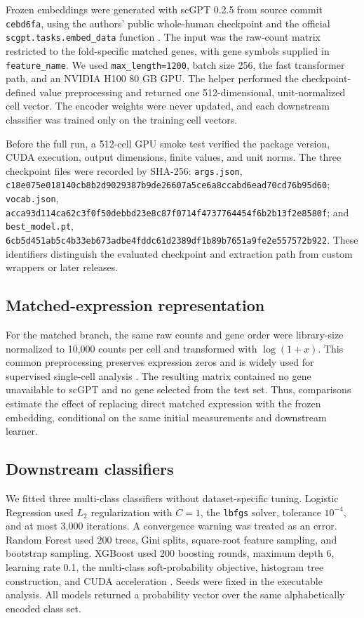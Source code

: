 Frozen embeddings were generated with scGPT 0.2.5 from source commit \texttt{cebd6fa}, using the authors' public whole-human checkpoint and the official \texttt{scgpt.tasks.embed\_data} function \citep{Cui2024}. The input was the raw-count matrix restricted to the fold-specific matched genes, with gene symbols supplied in \texttt{feature\_name}. We used \texttt{max\_length=1200}, batch size 256, the fast transformer path, and an NVIDIA H100 80 GB GPU. The helper performed the checkpoint-defined value preprocessing and returned one 512-dimensional, unit-normalized cell vector. The encoder weights were never updated, and each downstream classifier was trained only on the training cell vectors.

Before the full run, a 512-cell GPU smoke test verified the package version, CUDA execution, output dimensions, finite values, and unit norms. The three checkpoint files were recorded by SHA-256: \texttt{args.json}, \texttt{c18e075e018140cb8b2d9029387b9de26607a5ce6a8ccabd6ead70cd76b95d60}; \texttt{vocab.json}, \texttt{acca93d114ca62c3f0f50debbd23e8c87f0714f4737764454f6b2b13f2e8580f}; and \texttt{best\_model.pt}, \texttt{6cb5d451ab5c4b33eb673adbe4fddc61d2389df1b89b7651a9fe2e557572b922}. These identifiers distinguish the evaluated checkpoint and extraction path from custom wrappers or later releases.

\subsection{Matched-expression representation}

For the matched branch, the same raw counts and gene order were library-size normalized to 10,000 counts per cell and transformed with $\log(1+x)$. This common preprocessing preserves expression zeros and is widely used for supervised single-cell analysis \citep{Wolf2018,Hao2021}. The resulting matrix contained no gene unavailable to scGPT and no gene selected from the test set. Thus, comparisons estimate the effect of replacing direct matched expression with the frozen embedding, conditional on the same initial measurements and downstream learner.

\subsection{Downstream classifiers}

We fitted three multi-class classifiers without dataset-specific tuning. Logistic Regression used $L_2$ regularization with $C=1$, the \texttt{lbfgs} solver, tolerance $10^{-4}$, and at most 3,000 iterations. A convergence warning was treated as an error. Random Forest used 200 trees, Gini splits, square-root feature sampling, and bootstrap sampling. XGBoost used 200 boosting rounds, maximum depth 6, learning rate 0.1, the multi-class soft-probability objective, histogram tree construction, and CUDA acceleration \citep{Breiman2001,Chen2016}. Seeds were fixed in the executable analysis. All models returned a probability vector over the same alphabetically encoded class set.

